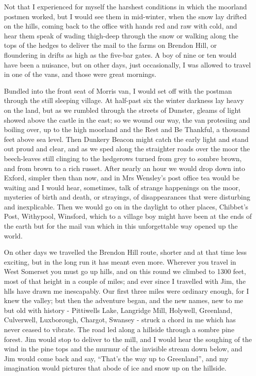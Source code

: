 Not that I experienced for myself the harshest conditions in which the moorland postmen worked, but I would see them in mid-winter, when the snow lay drifted on the hills, coming back to the office with hands red and raw with cold, and hear them speak of wading thigh-deep through the snow or walking along the tops of the hedges to deliver the mail to the farms on Brendon Hill, or floundering in drifts as high as the five-bar gates. A boy of nine or ten would have been a nuisance, but on other days, just occasionally, I was allowed to travel in one of the vans, and those were great mornings.

Bundled into the front seat of Morris van, I would set off with the postman through the still sleeping village. At half-past six the winter darkness lay heavy on the land, but as we rumbled through the streets of Dunster, gleams of light showed above the castle in the east; so we wound our way, the van protesiing and boiling over, up to the high moorland and the Rest and Be Thankful, a thousand feet above sea level. Then Dunkery Beacon might catch the early light and stand out proud and clear, and as we sped along the straighter roads over the moor the beech-leaves still clinging to the hedgerows turned from grey to sombre brown, and from brown to a rich russet. After nearly an hour we would drop down into Exford, simpler then than now, and in Mrs Wensley’s post office tea would be waiting and I would hear, sometimes, talk of strange happenings on the moor, mysteries of birth and death, or strayings, of disappearances that were disturbing and inexplicable. Then we would go on in the daylight to other places, Chibbet’s Post, Withypool, Winsford, which to a village boy might have been at the ends of the earth but for the mail van which in this unforgettable way opened up the world. 

On other days we travelled the Brendon Hill route, shorter and at that time less exciting, but in the long run it has meant even more. Wherever you travel in West Somerset you must go up hills, and on this round we climbed to 1300 feet, most of that height in a couple of miles; and ever since I travelled with Jim, the hlls have drawn me inescapably.
 Our first three miles were ordinary enough, for I knew the valley; but then the adventure began, and the new names, new to me but old with history - Pittiwells Lake, Langridge Mill, Holywell, Greenland, Culverwell, Luxborough, Chargot, Swansey - struck a chord in me which has never ceased to vibrate. The road led along a hillside through a sombre pine forest. Jim would stop to deliver to the mill, and I would hear the soughing of the wind in the pine tops and the murmur of the invisible stream down below, and Jim would come back and say, “That’s the way up to Greenland”, and my imagination would pictures that abode of ice and snow up on the hillside.

